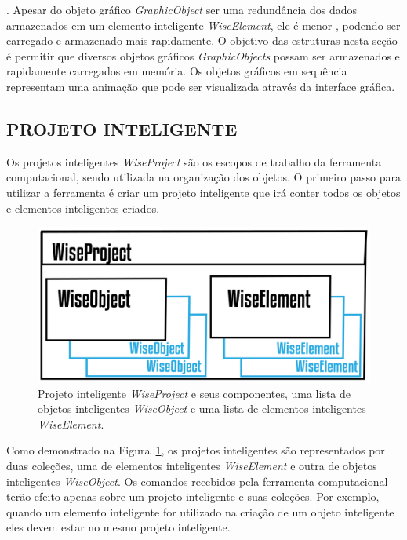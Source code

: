 . Apesar do objeto gráfico \textit{GraphicObject} ser uma redundância dos dados armazenados em um elemento inteligente \textit{WiseElement}, ele é menor , podendo ser carregado e armazenado mais rapidamente. O objetivo das estruturas nesta seção é permitir que diversos objetos gráficos \textit{GraphicObjects} possam ser armazenados  e rapidamente carregados em memória. Os objetos gráficos em sequência representam uma animação que pode ser visualizada através da interface gráfica. 


\subsection{PROJETO INTELIGENTE}\label{sec:projeto}

Os projetos inteligentes \textit{WiseProject} são os escopos de trabalho da ferramenta computacional, sendo utilizada na organização dos objetos. O primeiro passo para utilizar a ferramenta é criar um projeto inteligente que irá conter todos os objetos e elementos inteligentes criados.


\begin{figure}[!htbp]
	\centering
	\includegraphics[scale=2]{Figures/WiseProject@16x.png}
	\caption{Projeto inteligente \textit{WiseProject} e seus componentes, uma lista de objetos inteligentes \textit{WiseObject} e uma lista de elementos inteligentes \textit{WiseElement}.}
	\label{fig7:project}
\end{figure}

Como demonstrado na Figura~\ref{fig7:project}, os projetos inteligentes são representados por duas coleções, uma de elementos inteligentes \textit{WiseElement} e outra de objetos inteligentes \textit{WiseObject}. Os comandos recebidos pela ferramenta computacional terão efeito apenas sobre um projeto inteligente e suas coleções. Por exemplo, quando um elemento inteligente for utilizado na criação de um objeto inteligente eles devem estar no mesmo projeto inteligente.

